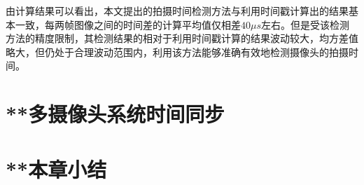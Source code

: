 由计算结果可以看出，本文提出的拍摄时间检测方法与利用时间戳计算出的结果基本一致，每两帧图像之间的时间差的计算平均值仅相差$40\mu s$左右。但是受该检测方法的精度限制，其检测结果的相对于利用时间戳计算的结果波动较大，均方差值略大，但仍处于合理波动范围内，利用该方法能够准确有效地检测摄像头的拍摄时间。

\section{**多摄像头系统时间同步}



\section{**本章小结}





























































